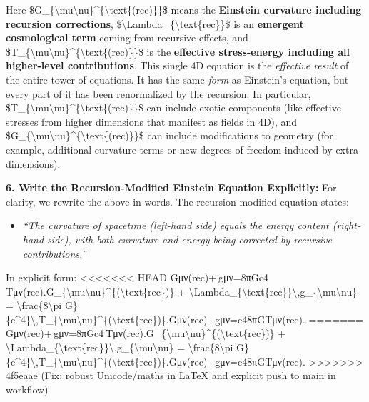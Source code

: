 \documentclass[]{article}
\begin{document}
Here
\$G\_\{\textbackslash{}mu\textbackslash{}nu\}\^{}\{\textbackslash{}text\{(rec)\}\}\$
means the \textbf{Einstein curvature including recursion corrections},
\$\textbackslash{}Lambda\_\{\textbackslash{}text\{rec\}\}\$ is an
\textbf{emergent cosmological term} coming from recursive effects, and
\$T\_\{\textbackslash{}mu\textbackslash{}nu\}\^{}\{\textbackslash{}text\{(rec)\}\}\$
is the \textbf{effective stress-energy including all higher-level
contributions}​. This single 4D equation is the \emph{effective result}
of the entire tower of equations. It has the same \emph{form} as
Einstein's equation, but every part of it has been renormalized by the
recursion. In particular,
\$T\_\{\textbackslash{}mu\textbackslash{}nu\}\^{}\{\textbackslash{}text\{(rec)\}\}\$
can include exotic components (like effective stresses from higher
dimensions that manifest as fields in 4D), and
\$G\_\{\textbackslash{}mu\textbackslash{}nu\}\^{}\{\textbackslash{}text\{(rec)\}\}\$
can include modifications to geometry (for example, additional curvature
terms or new degrees of freedom induced by extra dimensions).

\textbf{6. Write the Recursion-Modified Einstein Equation Explicitly:}
For clarity, we rewrite the above in words. The recursion-modified
equation states​:

\begin{itemize}
\item
  \emph{``The curvature of spacetime (left-hand side) equals the energy
  content (right-hand side), with both curvature and energy being
  corrected by recursive contributions.''}
\end{itemize}

In explicit form:
<<<<<<< HEAD
Gμν(rec)+\Lambdarec gμν=8πGc4 Tμν(rec).G\_\{\textbackslash mu\textbackslash nu\}\^{}\{(\textbackslash text\{rec\})\}
+
\textbackslash Lambda\_\{\textbackslash text\{rec\}\}\textbackslash,g\_\{\textbackslash mu\textbackslash nu\}
= \textbackslash frac\{8\textbackslash pi
G\}\{c\^{}4\}\textbackslash,T\_\{\textbackslash mu\textbackslash nu\}\^{}\{(\textbackslash text\{rec\})\}.Gμν(rec)\hspace{0pt}+\Lambdarec\hspace{0pt}gμν\hspace{0pt}=c48πG\hspace{0pt}Tμν(rec)\hspace{0pt}.
=======
Gμν(rec)+\Lambdarec gμν=8πGc4 Tμν(rec).G\_\{\textbackslash{}mu\textbackslash{}nu\}\^{}\{(\textbackslash{}text\{rec\})\}
+
\textbackslash{}Lambda\_\{\textbackslash{}text\{rec\}\}\textbackslash{},g\_\{\textbackslash{}mu\textbackslash{}nu\}
= \textbackslash{}frac\{8\textbackslash{}pi
G\}\{c\^{}4\}\textbackslash{},T\_\{\textbackslash{}mu\textbackslash{}nu\}\^{}\{(\textbackslash{}text\{rec\})\}.Gμν(rec)​+\Lambdarec​gμν​=c48πG​Tμν(rec)​.
>>>>>>> 4f5eaae (Fix: robust Unicode/maths in LaTeX and explicit push to main in workflow)
\end{document}
